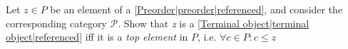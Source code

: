 
Let $z \in P$ be an element of a \ref{Preorder|preorder|referenced}, and consider the corresponding category $\mathcal{P}$. Show that \emph{z} is a \ref{Terminal object|terminal object|referenced} iff it is a \emph{top element} in $P$, i.e. $\forall c \in P: c \leq z$